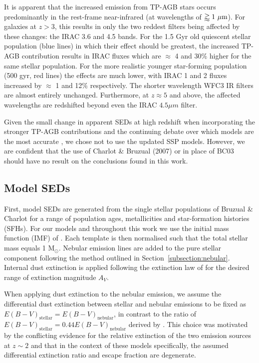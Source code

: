 It is apparent that the increased emission from TP-AGB stars occurs predominantly in the rest-frame near-infrared (at wavelengths of $\gtrapprox 1~\hbox{$\mu$m}$). For galaxies at $z > 3$, this results in only the two reddest filters being affected by these changes: the IRAC 3.6 and 4.5 \micron{} bands. For the 1.5 Gyr old quiescent stellar population (blue lines) in which their effect should be greatest, the increased TP-AGB contribution results in IRAC fluxes which are $\approx$ 4 and 30\% higher for the same stellar population. For the more realistic younger star-forming population (500 gyr, red lines) the effects are much lower, with IRAC 1 and 2 fluxes increased by $\approx$ 1 and 12\% respectively. The shorter wavelength WFC3 IR filters are almost entirely unchanged. Furthermore, at $z\approx5$ and above, the affected wavelengths are redshifted beyond even the IRAC $4.5\mu m$ filter.

Given the small change in apparent SEDs at high redshift when incorporating the stronger TP-AGB contributions and the continuing debate over which models are the most accurate \citep{Kriek:2010hi}, we chose not to use the updated SSP models. However, we are confident that the use of Charlot \& Bruzual (2007) or \citet{Maraston:2005er} in place of BC03 should have no result on the conclusions found in this work.


\subsection{Model SEDs}\label{subsmf-sec:seds}
First, model SEDs are generated from the single stellar populations of Bruzual \& Charlot for a range of population ages, metallicities and star-formation histories (SFHs). For our models and throughout this work we use the initial mass function (IMF) of \citet{Chabrier:2003ki}. Each template is then normalised such that the total stellar mass equals 1 M$_{\odot}$. Nebular emission lines are added to the pure stellar component following the method outlined in Section~\ref{subsection:nebular}. Internal dust extinction is applied following the extinction law of \citet{2000ApJ...533..682C} for the desired range of extinction magnitude $A_{V}$.

When applying dust extinction to the nebular emission, we assume the differential dust extinction between stellar and nebular emissions to be fixed as $E(B-V)_{\text{stellar}} = E(B-V)_{\text{nebular}}$, in contrast to the ratio of $E(B-V)_{\text{stellar}} = 0.44 E(B-V)_{\text{nebular}}$ derived by \citet{2000ApJ...533..682C}. This choice was motivated by the conflicting evidence for the relative extinction of the two emission sources at $z \sim 2$ \citep{Erb:2006ke,ForsterSchreiber:2009hm} and that in the context of these models specifically, the assumed differential extinction ratio and escape fraction are degenerate.

